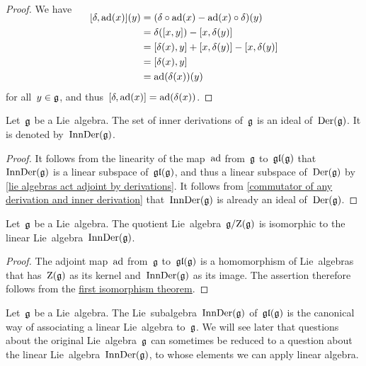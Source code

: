 \begin{proof}
	We have
	\begin{align*}
		\SwapAboveDisplaySkip
		[\delta, \ad(x)](y)
		&= 
		( \delta \circ \ad(x) - \ad(x) \circ \delta )(y)
		\\
		&=
		\delta([x,y]) - [x,\delta(y)]
		\\
		&=
		[\delta(x),y] + [x,\delta(y)] - [x,\delta(y)]
		\\
		&=
		[\delta(x),y]
		\\
		&=
		\ad(\delta(x))(y)
	\end{align*}
	for all~$y \in \mathfrak{g}$, and thus~$[\delta, \operatorname{ad}(x)] = \operatorname{ad}(\delta(x))$.
\end{proof}


\begin{corollary}
	\label{inner derivations are an ideal}
	Let~$\mathfrak{g}$ be a Lie~algebra.
	The set of inner derivations of~$\mathfrak{g}$ is an ideal of~$\operatorname{Der}(\mathfrak{g})$.
	It is denoted by~$\operatorname{InnDer}(\mathfrak{g})$.
\end{corollary}


\begin{proof}
	It follows from the linearity of the map~$\operatorname{ad}$ from~$\mathfrak{g}$ to~$\mathfrak{gl}(\mathfrak{g})$ that~$\operatorname{InnDer}(\mathfrak{g})$ is a linear subspace of~$\mathfrak{gl}(\mathfrak{g})$, and thus a linear subspace of~$\operatorname{Der}(\mathfrak{g})$ by \cref{lie algebras act adjoint by derivations}.
	It follows from \cref{commutator of any derivation and inner derivation} that~$\operatorname{InnDer}(\mathfrak{g})$ is already an ideal of~$\operatorname{Der}(\mathfrak{g})$. 
\end{proof}


\begin{proposition}
	Let~$\mathfrak{g}$ be a Lie~algebra.
	The quotient Lie~algebra~$\mathfrak{g}/{\operatorname{Z}(\mathfrak{g})}$ is isomorphic to the linear Lie~algebra~$\operatorname{InnDer}(\mathfrak{g})$.
\end{proposition}


\begin{proof}
	The adjoint map~$\operatorname{ad}$ from~$\mathfrak{g}$ to~$\mathfrak{gl}(\mathfrak{g})$ is a homomorphism of Lie~algebras that has~$\operatorname{Z}(\mathfrak{g})$ as its kernel and~$\operatorname{InnDer}(\mathfrak{g})$ as its image.
	The assertion therefore follows from the \hyperref[first isomorphism theorem]{first isomorphism theorem}.
\end{proof}


\begin{remark}
	Let~$\mathfrak{g}$ be a Lie~algebra.
	The Lie~subalgebra~$\operatorname{InnDer}(\mathfrak{g})$ of~$\mathfrak{gl}(\mathfrak{g})$ is the canonical way of associating a linear Lie~algebra to~$\mathfrak{g}$.
	We will see later that questions about the original Lie~algebra~$\mathfrak{g}$ can sometimes be reduced to a question about the linear Lie~algebra~$\operatorname{InnDer}(\mathfrak{g})$, to whose elements we can apply linear algebra.
\end{remark}


